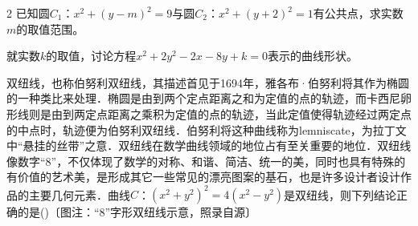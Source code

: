 \documentclass[fontset=none]{ctexart}
\begin{document}
\begin{multicols}{2}
 已知圆\(C_{1}\)：\(x^{2}+(y-m)^{2}=9\)与圆\(C_{2}\)：\(x^{2}+(y+2)^{2}=1\)有公共点，求实数\(m\)的取值范围。

\begin{ansblock}[2章-练-课时10-中3]
\end{ansblock}

 就实数\(k\)的取值，讨论方程\(x^{2}+2y^{2}-2x-8y+k=0\)表示的曲线形状。

\begin{ansblock}[2章-练-课时10-中4]
\end{ansblock}


 双纽线，也称伯努利双纽线，其描述首见于1694年，雅各布·伯努利将其作为椭圆的一种类比来处理．椭圆是由到两个定点距离之和为定值的点的轨迹，而卡西尼卵形线则是由到两定点距离之乘积为定值的点的轨迹，当此定值使得轨迹经过两定点的中点时，轨迹便为伯努利双纽线．伯努利将这种曲线称为lemniscate，为拉丁文中“悬挂的丝带”之意．双纽线在数学曲线领域的地位占有至关重要的地位．双纽线像数字“8”，不仅体现了数学的对称、和谐、简洁、统一的美，同时也具有特殊的有价值的艺术美，是形成其它一些常见的漂亮图案的基石，也是许多设计者设计作品的主要几何元素．曲线\(C\)：\((x^{2}+y^{2})^{2}=4(x^{2}-y^{2})\)是双纽线，则下列结论正确的是\nobreak(\kongwei)〔图注：“8”字形双纽线示意，照录自源〕




\end{multicols}
\end{document}
